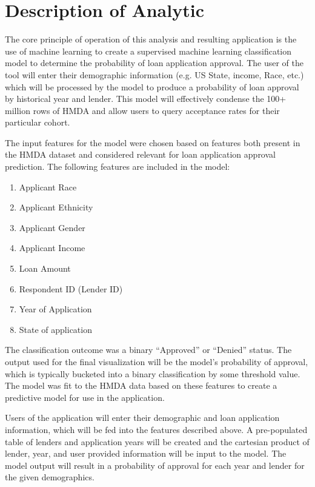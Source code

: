 \documentclass[conference,compsoc]{IEEEtran}
\begin{document}
\section{Description of Analytic}

The core principle of operation of this analysis and resulting application is the use of machine learning to create a supervised machine learning classification model to determine the probability of loan application approval. The user of the tool will enter their demographic information (e.g. US State, income, Race, etc.) which will be processed by the model to produce a probability of loan approval by historical year and lender. This model will effectively condense the 100+ million rows of HMDA and allow users to query acceptance rates for their particular cohort. 


    The input features for the model were chosen based on features both present in the HMDA dataset and considered relevant for loan application approval prediction. The following features are included in the model:


\begin{enumerate}
\item Applicant Race
\item Applicant Ethnicity
\item Applicant Gender
\item Applicant Income
\item Loan Amount
\item Respondent ID (Lender ID)
\item Year of Application
\item State of application


\end{enumerate}

The classification outcome was a binary “Approved” or “Denied” status. The output used for the final visualization will be the model’s probability of approval, which is typically bucketed into a binary classification by some threshold value. The model was fit to the HMDA data based on these features to create a predictive model for use in the application.

Users of the application will enter their demographic and loan application information, which will be fed into the features described above. A pre-populated table of lenders and application years will be created and the cartesian product of lender, year, and user provided information will be input to the model. The model output will result in a probability of approval for each year and lender for the given demographics.
\end{document}
